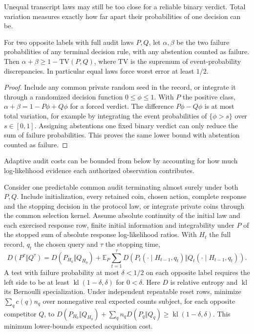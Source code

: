 Unequal transcript laws may still be too close for a reliable binary verdict. Total variation measures exactly how far apart their probabilities of one decision can be.

\begin{theorem}\label{thm:t21}

For two opposite labels with full audit laws \(P,Q\), let \(\alpha,\beta\) be the two failure probabilities of any terminal decision rule, with any abstention counted as failure. Then \(\alpha+\beta\ge1-\mathrm{TV}(P,Q)\), where \(\mathrm{TV}\) is the supremum of event-probability discrepancies. In particular equal laws force worst error at least \(1/2\).

\end{theorem}

\begin{proof}

Include any common private random seed in the record, or integrate it through a randomized decision function \(0\le\phi\le1\). With \(P\) the positive class, \(\alpha+\beta=1-P\phi+Q\phi\) for a forced verdict. The difference \(P\phi-Q\phi\) is at most total variation, for example by integrating the event probabilities of \(\{\phi>s\}\) over \(s\in[0,1]\). Assigning abstentions one fixed binary verdict can only reduce the sum of failure probabilities. This proves the same lower bound with abstention counted as failure.

\end{proof}

Adaptive audit costs can be bounded from below by accounting for how much log-likelihood evidence each authorized observation contributes.

\begin{theorem}\label{thm:t22}

Consider one predictable common audit terminating almost surely under both \(P,Q\). Include initialization, every retained coin, chosen action, complete response and the stopping decision in the protocol law, or integrate private coins through the common selection kernel. Assume absolute continuity of the initial law and each exercised response row, finite initial information and integrability under \(P\) of the stopped sum of absolute response log-likelihood ratios. With \(H_t\) the full record, \(q_t\) the chosen query and \(\tau\) the stopping time,
\[
D(P^\tau\Vert Q^\tau)=D(P_{H_0}\Vert Q_{H_0})+
\mathbb E_P\sum_{t=1}^{\tau}D(P_t(\cdot\mid H_{t-1},q_t)\Vert Q_t(\cdot\mid H_{t-1},q_t)).
\]
A test with failure probability at most \(\delta<1/2\) on each opposite label requires the left side to be at least \(\operatorname{kl}(1-\delta,\delta)\) for \(0<\delta\). Here \(D\) is relative entropy and \(\operatorname{kl}\) its Bernoulli specialization. Under independent repeatable reset rows, minimize \(\sum_q c(q)n_q\) over nonnegative real expected counts subject, for each opposite competitor \(Q\), to \(D(P_{H_0}\Vert Q_{H_0})+\sum_q n_qD(P_q\Vert Q_q)\ge\operatorname{kl}(1-\delta,\delta)\). This minimum lower-bounds expected acquisition cost.

\end{theorem}

